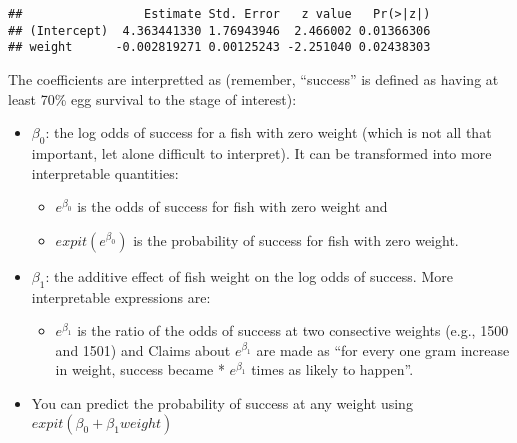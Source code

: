 \documentclass[]{book}
\newenvironment{Shaded}{\begin{snugshade}}{\end{snugshade}}
\newcommand{\KeywordTok}[1]{\textcolor[rgb]{0.13,0.29,0.53}{\textbf{#1}}}
\newcommand{\DataTypeTok}[1]{\textcolor[rgb]{0.13,0.29,0.53}{#1}}
\newcommand{\StringTok}[1]{\textcolor[rgb]{0.31,0.60,0.02}{#1}}
\newcommand{\OperatorTok}[1]{\textcolor[rgb]{0.81,0.36,0.00}{\textbf{#1}}}
\newcommand{\NormalTok}[1]{#1}
\providecommand{\tightlist}{%
  \setlength{\itemsep}{0pt}\setlength{\parskip}{0pt}}
\theoremstyle{definition}
\theoremstyle{definition}
\theoremstyle{definition}
\theoremstyle{remark}
\begin{document}
\begin{Shaded}
\end{Shaded}

\begin{verbatim}
##                 Estimate Std. Error   z value   Pr(>|z|)
## (Intercept)  4.363441330 1.76943946  2.466002 0.01366306
## weight      -0.002819271 0.00125243 -2.251040 0.02438303
\end{verbatim}

The coefficients are interpretted as (remember, ``success'' is defined
as having at least 70\% egg survival to the stage of interest):

\begin{itemize}
\tightlist
\item
  \(\beta_0\): the log odds of success for a fish with zero weight
  (which is not all that important, let alone difficult to interpret).
  It can be transformed into more interpretable quantities:

  \begin{itemize}
  \tightlist
  \item
    \(e^{\beta_0}\) is the odds of success for fish with zero weight and
  \item
    \(expit(e^{\beta_0})\) is the probability of success for fish with
    zero weight.
  \end{itemize}
\item
  \(\beta_1\): the additive effect of fish weight on the log odds of
  success. More interpretable expressions are:

  \begin{itemize}
  \tightlist
  \item
    \(e^{\beta_1}\) is the ratio of the odds of success at two
    consective weights (e.g., 1500 and 1501) and Claims about
    \(e^{\beta_1}\) are made as ``for every one gram increase in weight,
    success became * \(e^{\beta_1}\) times as likely to happen''.
  \end{itemize}
\item
  You can predict the probability of success at any weight using
  \(expit(\beta_0 + \beta_1 weight)\)
\end{itemize}
\end{document}
